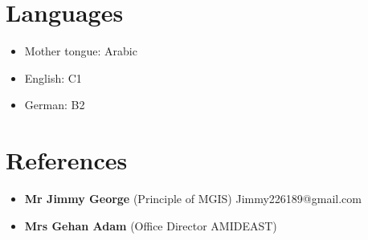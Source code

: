 \documentclass[a4paper,12pt]{article}
\begin{document}
\section{Languages}
\begin{itemize}
    \item Mother tongue: Arabic
    \item English: C1
    \item German: B2
\end{itemize}

\section{References}
\begin{itemize}
    \item \textbf{Mr Jimmy George} (Principle of MGIS) Jimmy226189@gmail.com
    \item \textbf{Mrs Gehan Adam}  (Office Director AMIDEAST)  
\end{itemize}
\end{document}
